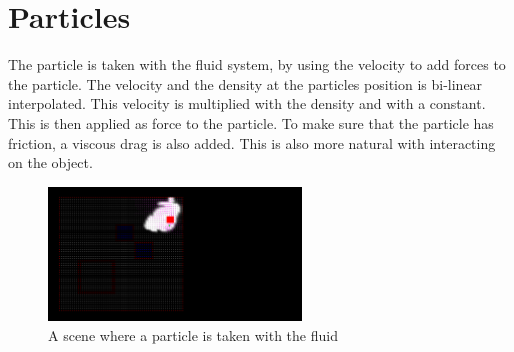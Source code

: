 \chapter{Particles} 
The particle is taken with the fluid system, by using the velocity to add forces to the particle. The velocity and the density at the particles position is bi-linear interpolated. This velocity is multiplied with the density and with a constant. This is then applied as force to the particle. To make sure that the particle has friction, a viscous drag is also added. This is also more natural with interacting on the object.

\begin{figure}[htb!]
    \centering
    \includegraphics[width=0.6\textwidth]{images/Particle}
    \caption{A scene where a particle is taken with the fluid}
    \label{fig:Particle}
\end{figure}